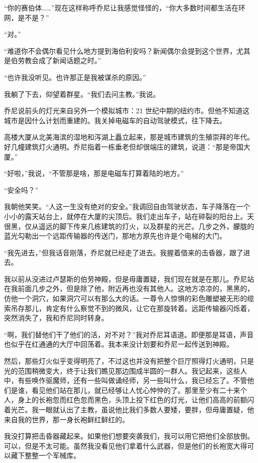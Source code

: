 \documentclass[AutoFakeBold=true]{book}
\begin{document}
``你的赛伯体……''现在这样称呼乔尼让我感觉怪怪的，``你大多数时间都生活在环网，是不是？''

``对。''

``难道你不会偶尔看见什么地方提到海伯利安吗？新闻偶尔会提到这个世界，尤其是伯劳教会成了新闻话题之时。''

``也许我没听见。也许那正是我被谋杀的原因。''

我躺了下去，仰望着群星。``我们去问主教。''我说。

乔尼说前头的灯光来自另外一个模拟城市：21 世纪中期的纽约市。但他不知道这城市是因什么计划而重建的。我关掉电磁车的自动驾驶模式，往下降去。

高楼大厦从北美海滨的湿地和泻湖上矗立起来，那是城市建筑的生殖崇拜的年代。好几幢建筑灯火通明。乔尼指着一栋垂老但却很端庄的建筑，说道：``那是帝国大厦。''

``好啦，''我说，``不管那是啥，那是电磁车打算着陆的地方。''

``安全吗？''

我朝他笑笑。``人这一生没有绝对的安全。''我调回自由驾驶状态，车子降落在一个小小的露天站台上，就停在大厦的尖顶后。我们走出车子，站在碎裂的阳台上。天很黑，仅从遥远的脚下传来几栋建筑的灯火，以及群星的光芒。几步之外，朦胧的蓝光勾勒出一个远距传输器的传送门，那地方原先也许是个电梯的大门。

``我先进去，''但我话音刚落，乔尼就已经走了进去。我握着借来的击昏器，跟了进去。

我以前从没进过卢瑟斯的伯劳神殿，但是毋庸置疑，我们现在就是在那儿。乔尼站在我前面几步之外，但是除了他，附近再也没有其他人。这地方凉凉的，黑黑的，仿他一个洞穴，如果洞穴可以有那么大的话。一尊令人惊惧的彩色雕塑被无形的缆索吊存那儿，肯定有什么察觉不到的微风，让它在那旋转着。远距传输器闪烁着，突然消失了，我和乔尼同时转身。

``啊，我们替他们干了他们的活，对不对？''我对乔尼耳语道。即便那是耳语，声音也似乎在红通通的大厅中回荡着。我本来没计划要和乔尼一起传送到神殿。

然后，那些灯火似乎变得明亮了，不过这也并没有把整个巨厅照得灯火通明，只是光的范围稍微变大，终于让我们瞧见那边围成半圆的一群人。我记起来，这些人中，有些唤作驱魔师，还有一些叫做诵经师，另一些叫什么，我已经忘了。不管他们是谁，看见他们站在那儿，就已经够让人忧心忡忡的了。那里至少有二十来个人，身上的长袍忽而红色忽而黑色，头顶上投下红色的灯光，让他们高高的前额闪着光芒。我一眼就认出了主教，虽说他比我们多数人要矮，要胖，但毋庸置疑，他来自我的世界，那一身长袍鲜红鲜红的。

我没打算把击昏器藏起来。如果他们想要突袭我们，我可以用它把他们全部放倒。可以，但是不太可能。虽然我没看见他们拿着什么武器，但是他们的长袍宽大得可以藏下整整一个军械库。
\end{document}
